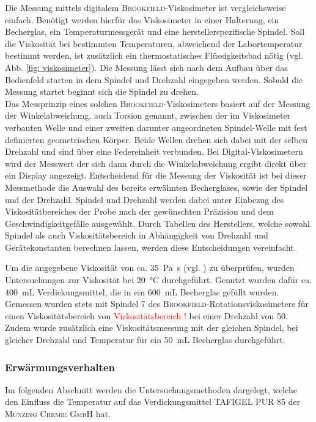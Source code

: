 Die Messung mittels digitalem \textsc{Brookfield}-Viskosimeter ist vergleichsweise einfach. Benötigt werden hierfür das Viskosimeter in einer Halterung, ein Becherglas, ein Temperaturmessgerät und eine herstellerspezifische Spindel. Soll die Viskosität bei bestimmten Temperaturen, abweichend der Labortemperatur bestimmt werden, ist zusätzlich ein thermostatisches Flüssigkeitsbad nötig (vgl. Abb. \ref{fig: viskosimeter}). Die Messung lässt sich nach dem Aufbau über das Bedienfeld starten in dem Spindel und Drehzahl eingegeben werden. Sobald die Messung startet beginnt sich die Spindel zu drehen.\\
Das Messprinzip eines solchen \textsc{Brookfield}-Viskosimeters basiert auf der Messung der Winkelabweichung, auch Torsion genannt, zwischen der im Viskosimeter verbauten Welle und einer zweiten darunter angeordneten Spindel-Welle mit fest definierten geometrischen Körper. Beide Wellen drehen sich dabei mit der selben Drehzahl  und sind über eine Federeinheit verbunden. Bei Digital-Viskosimetern wird der Messwert der sich dann durch die Winkelabweichung ergibt direkt über ein Display angezeigt.\linebreak
Entscheidend für die Messung der Viskosität ist bei dieser Messmethode die Auswahl des bereits erwähnten Becherglases, sowie der Spindel und der Drehzahl. Spindel und Drehzahl werden dabei unter Einbezug des Viskositätbereiches der Probe nach der gewünschten Präzision und dem Geschwindigkeitgefälle ausgewählt. \cite{DINDeutschesInstitutfurNormunge.V..September2018} 
Durch Tabellen des Herstellers, welche sowohl Spindel als auch Viskositätsbereich in Abhängigkeit von Drehzahl und Gerätekonstanten berechnen lassen, werden diese Entscheidungen vereinfacht. \cite{brookfield_31.01.2022} \linebreak

Um die angegebene Viskosität von ca. \SI{35}{\pascal \second} (vgl. \cite{MunzingChemieGmbH.2020}) zu überprüfen, wurden Untersuchungen zur Viskosität bei \SI{20}{\celsius} durchgeführt. Genutzt wurden dafür ca. \SI{400}{\milli \liter} Verdickungsmittel, die in ein \SI{600}{\milli \liter} Becherglas gefüllt wurden. Gemessen wurden stets mit Spindel 7 des \textsc{Brookfield}-Rotationsviskosimeters für einen Viskositätsbereich von \textcolor{red}{Viskositätsbereich !} bei einer Drehzahl von \SI{50}{\rpm}. Zudem wurde zusätzlich eine Viskositätsmessung mit der gleichen Spindel, bei gleicher Drehzahl und Temperatur für ein \SI{50}{\milli \liter} Becherglas durchgeführt.


\subsubsection{Erwärmungsverhalten}
Im folgenden Abschnitt werden die Untersuchungsmethoden dargelegt, welche den Einfluss die Temperatur auf das Verdickungsmittel TAFIGEL PUR 85 der \textsc{Münzing Chemie GmbH} hat.

